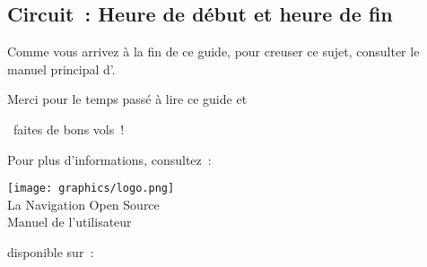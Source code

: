 \documentclass[french, a4paper, 12pt]{refrep}
\begin{document}
\subsection*{\textcolor{flashblue}{Circuit~: Heure de début et heure de fin}}
Comme vous arrivez à la fin de ce guide, pour creuser ce sujet, consulter le manuel principal d'\xc.

Merci pour le temps passé à lire ce guide et\textellipsis

\textellipsis\ faites de bons vols~!%




\newpage
\pagestyle{empty}

\normalsize{Pour plus d'informations, consultez~:}

\begin{center}
    \texttt{[image: graphics/logo.png]}
    \vskip 0.5cm
    \fontsize{50}{0}
    \selectfont\textbf{\xc}\\
    \fontsize{12}{12}
    \vspace{0.2em}
    \LARGE{La Navigation Open Source}\\
    \vspace{1.2em}
    \LARGE{Manuel de l'utilisateur}\\
    
\vspace{9em}

\end{center}
\begin{flushright}
\normalsize disponible sur~: 
\end{flushright}
\end{document}
